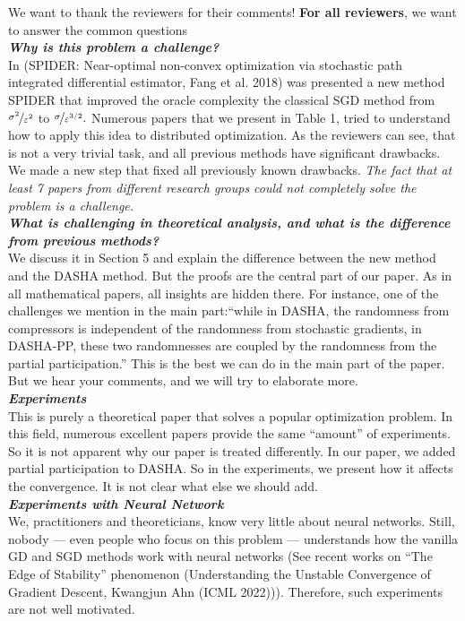 \documentclass{article}
\begin{document}
We want to thank the reviewers for their comments! \textbf{For all reviewers}, we want to answer the common questions \\
\textbf{\textit{Why is this problem a challenge?}} \\
In (SPIDER: Near-optimal non-convex optimization via stochastic path integrated differential estimator, 
Fang et al. 2018) was presented a new method SPIDER that improved the oracle complexity the classical SGD method from $\nicefrac{\sigma^2}{\varepsilon^2}$ to $\nicefrac{\sigma}{\varepsilon^{3/2}}.$ Numerous papers that we present in Table 1, tried to understand how to apply this idea to distributed optimization. As the reviewers can see, that is not a very trivial task, and all previous methods have significant drawbacks. We made a new step that fixed all previously known drawbacks. \emph{The fact that at least 7 papers from different research groups could not completely solve the problem is a challenge.} \\
\textbf{\textit{What is challenging in theoretical analysis, and what is the difference from previous methods?}} \\
We discuss it in Section 5 and explain the difference between the new method and the DASHA method. But the proofs are the central part of our paper. As in all mathematical papers, all insights are hidden there. For instance, one of the challenges we mention in the main part:``while in DASHA, the randomness from compressors is independent of the randomness from stochastic gradients, in DASHA-PP, these two randomnesses are coupled by the randomness from the partial participation.'' This is the best we can do in the main part of the paper. But we hear your comments, and we will try to elaborate more.\\
\textbf{\textit{Experiments}}\\
This is purely a theoretical paper that solves a popular optimization problem. In this field, numerous excellent papers provide the same ``amount'' of experiments. So it is not apparent why our paper is treated differently. In our paper, we added partial participation to DASHA. So in the experiments, we present how it affects the convergence. It is not clear what else we should add.\\
\textbf{\textit{Experiments with Neural Network}} \\
We, practitioners and theoreticians, know very little about neural networks. Still, nobody --- even people who focus on this problem --- understands how the vanilla GD and SGD methods work with neural networks (See recent works on ``The Edge of Stability'' phenomenon (Understanding the Unstable Convergence of Gradient Descent, Kwangjun Ahn (ICML 2022))). Therefore, such experiments are not well motivated. \\
\end{document}

